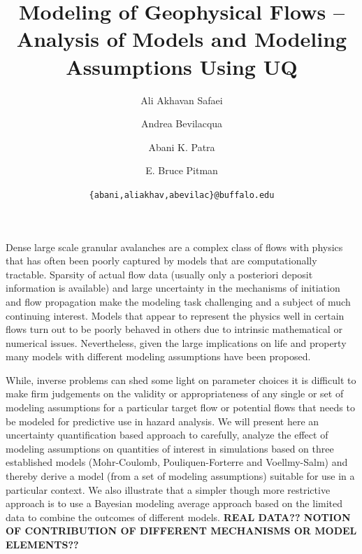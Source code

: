 \documentclass{article}
\begin{document}
\title{\bf Modeling of Geophysical Flows -- Analysis of Models and Modeling Assumptions Using UQ}
\author[1]{Ali Akhavan Safaei}
\author[2]{Andrea Bevilacqua}
\author[1,3]{Abani K. Patra}
\author[4]{E. Bruce Pitman}


\date{\texttt{\{abani,aliakhav,abevilac\}@buffalo.edu}}


\maketitle

\abstract
Dense large scale granular avalanches are a complex class of flows with physics that has often been poorly captured by models that are computationally tractable. Sparsity of actual flow data (usually only a posteriori  deposit information is available) and large uncertainty in the mechanisms of initiation and flow propagation make the modeling task challenging and a
subject of much continuing interest. Models that appear to represent the physics well
 in certain flows turn out to be poorly behaved in others due to intrinsic mathematical or numerical issues.
Nevertheless, given the large implications on life and property many models with different modeling assumptions have been proposed.

While, inverse problems can shed some light on parameter choices it is difficult to make firm judgements on the validity or appropriateness of any single or set of modeling assumptions for a particular target flow or potential flows that needs to be modeled for predictive use in hazard analysis. We will present here an uncertainty quantification  based approach to carefully, analyze the effect of modeling assumptions on quantities of
interest in simulations based on three established models (Mohr-Coulomb, Pouliquen-Forterre and Voellmy-Salm) and thereby derive a model (from a set of modeling assumptions) suitable for use in a particular context. We also illustrate that a simpler though more restrictive approach is to use a Bayesian modeling average approach based on the limited data to combine the outcomes of different models.
{\bf  REAL DATA?? NOTION OF CONTRIBUTION OF DIFFERENT MECHANISMS OR MODEL ELEMENTS??}
\newpage
\end{document}
